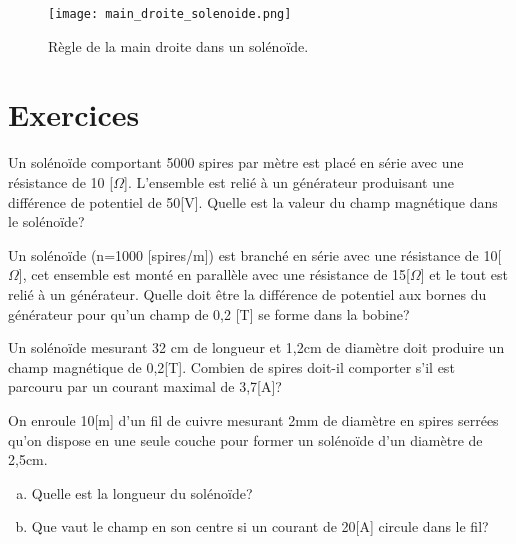 \begin{figure}[h]
    \centering
    \texttt{[image: main\_droite\_solenoide.png]}
    \caption{Règle de la main droite dans un solénoïde.}
    \label{main_droite_solenoide}
\end{figure}

\newpage

\section{Exercices}
\begin{exercise}
    Un solénoïde comportant 5000 spires par mètre est placé en série avec une résistance de 10 [\(\Omega\)]. L'ensemble est relié à un générateur produisant une différence de potentiel de 50[V]. Quelle est la valeur du champ magnétique dans le solénoïde?
\end{exercise}

\begin{exercise}
    Un solénoïde (n=1000 [spires/m]) est branché en série avec une résistance de 10[\(\Omega\)], cet ensemble est monté en parallèle avec une résistance de 15[\(\Omega\)] et le tout est relié à un générateur. Quelle doit être la différence de potentiel aux bornes du générateur pour qu'un champ de 0,2 [T] se forme dans la bobine?
\end{exercise}

\begin{exercise}
    Un solénoïde mesurant 32 cm de longueur et 1,2cm de diamètre doit produire un champ magnétique de 0,2[T]. Combien de spires doit-il comporter s'il est parcouru par un courant maximal de 3,7[A]?
\end{exercise}

\begin{exercise}
    On enroule 10[m] d'un fil de cuivre mesurant 2mm de diamètre en spires serrées qu'on dispose en une seule couche pour former un solénoïde d'un diamètre de 2,5cm.
    \begin{enumerate}[a)]
        \item Quelle est la longueur du solénoïde?
        \item Que vaut le champ en son centre si un courant de 20[A] circule dans le fil?
    \end{enumerate}
\end{exercise}






